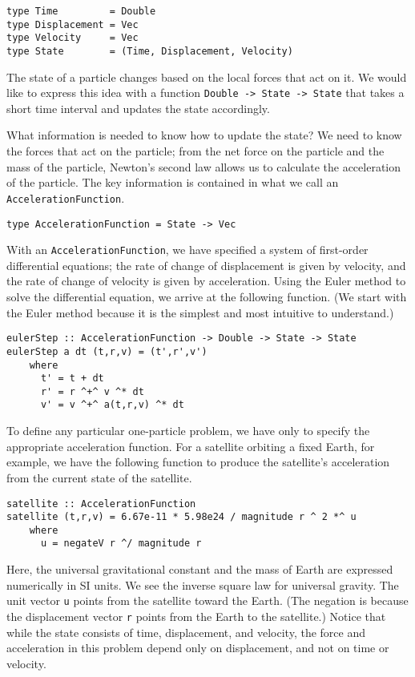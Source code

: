 \documentclass[11pt]{article}
\begin{document}
\begin{verbatim}
type Time         = Double
type Displacement = Vec
type Velocity     = Vec
type State        = (Time, Displacement, Velocity)
\end{verbatim}

The state of a particle changes based on the local forces that act on it.
We would like to express this idea with a function
\verb|Double -> State -> State| that takes a short time interval
and updates the state accordingly.

What information is needed to know how to update the state?
We need to know the forces that act on the particle; from the
net force on the particle and the mass of the particle, Newton's
second law allows us to calculate the acceleration of the particle.
The key information is contained in what we call an
\verb|AccelerationFunction|.

\begin{verbatim}
type AccelerationFunction = State -> Vec
\end{verbatim}

With an \verb|AccelerationFunction|, we have specified a
system of first-order differential equations; the rate of change
of displacement is given by velocity, and the rate of change of
velocity is given by acceleration.
Using the Euler method to solve the differential equation,
we arrive at the following function.  (We start with the Euler
method because it is the simplest and most intuitive to understand.)

\begin{verbatim}
eulerStep :: AccelerationFunction -> Double -> State -> State
eulerStep a dt (t,r,v) = (t',r',v')
    where
      t' = t + dt
      r' = r ^+^ v ^* dt
      v' = v ^+^ a(t,r,v) ^* dt
\end{verbatim}

To define any particular one-particle problem, we have only to specify the appropriate
acceleration function.
For a satellite orbiting a fixed Earth, for example, we have
the following function to produce the satellite's acceleration from
the current state of the satellite.
\begin{verbatim}
satellite :: AccelerationFunction
satellite (t,r,v) = 6.67e-11 * 5.98e24 / magnitude r ^ 2 *^ u
    where
      u = negateV r ^/ magnitude r
\end{verbatim}
Here, the universal gravitational constant and the mass of Earth
are expressed numerically in SI units.  We see the inverse square law
for universal gravity.  The unit vector \verb|u|
points from the satellite toward the Earth.
(The negation is because the displacement vector \verb|r| points
from the Earth to the satellite.)  Notice that while the state
consists of time, displacement, and velocity, the force and acceleration
in this problem depend only on displacement, and not on time or velocity.
\end{document}
